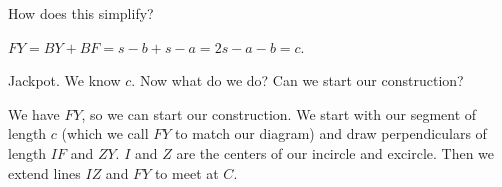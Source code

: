 


How does this simplify?










$FY = BY + BF = s - b + s - a = 2s - a - b = c$.

Jackpot. We know $c.$ Now what do we do? Can we start our construction?



We have $FY$, so we can start our construction. We start with our segment of length $c$ (which we call $FY$ to match our diagram) and draw perpendiculars of length $IF$ and $ZY.$ $I$ and $Z$ are the centers of our incircle and excircle. Then we extend lines $IZ$ and $FY$ to meet at $C.$




